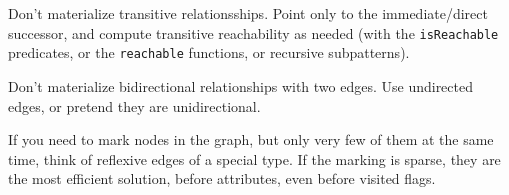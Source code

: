 \pagebreak

\begin{note}
Don't materialize transitive relationsships. 
Point only to the immediate/direct successor, and compute transitive reachability as needed (with the \texttt{isReachable} predicates, or the \texttt{reachable} functions, or recursive subpatterns).
\end{note}

\begin{note}
Don't materialize bidirectional relationships with two edges. 
Use undirected edges, or pretend they are unidirectional.
\end{note}

\begin{note}
If you need to mark nodes in the graph, but only very few of them at the same time, think of reflexive edges of a special type. If the marking is sparse, they are the most efficient solution, before attributes, even before visited flags.
\end{note}

